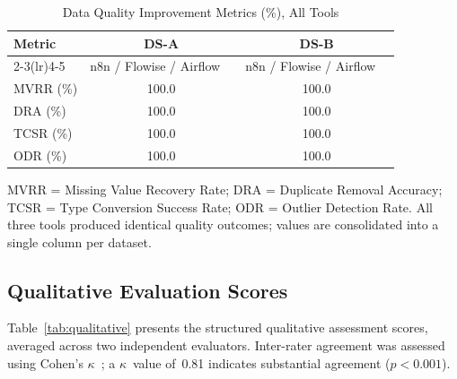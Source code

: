 \documentclass[journal]{IEEEtran}
\begin{document}
\begin{table}[!t]
  \caption{Data Quality Improvement Metrics (\%), All Tools}
  \label{tab:quality}
  \begin{threeparttable}
  \renewcommand{\arraystretch}{1.25}
  \centering
  \small
  \begin{tabular}{@{}lcccc@{}}
    \toprule
    \multirow{2}{*}{\textbf{Metric}}
      & \multicolumn{2}{c}{\textbf{DS-A}}
      & \multicolumn{2}{c}{\textbf{DS-B}} \\
    \cmidrule(lr){2-3}\cmidrule(lr){4-5}
      & n8n / Flowise / Airflow & & n8n / Flowise / Airflow & \\
    \midrule
    MVRR (\%) & \multicolumn{2}{c}{100.0} & \multicolumn{2}{c}{100.0} \\
    DRA  (\%) & \multicolumn{2}{c}{100.0} & \multicolumn{2}{c}{100.0} \\
    TCSR (\%) & \multicolumn{2}{c}{100.0} & \multicolumn{2}{c}{100.0} \\
    ODR  (\%) & \multicolumn{2}{c}{100.0} & \multicolumn{2}{c}{100.0} \\
    \bottomrule
  \end{tabular}
  \begin{tablenotes}
    \footnotesize
    \item MVRR = Missing Value Recovery Rate; DRA = Duplicate Removal
    Accuracy; TCSR = Type Conversion Success Rate; ODR = Outlier Detection
    Rate. All three tools produced identical quality outcomes; values are
    consolidated into a single column per dataset.
  \end{tablenotes}
  \end{threeparttable}
\end{table}

\subsection{Qualitative Evaluation Scores}

Table~\ref{tab:qualitative} presents the structured qualitative
assessment scores, averaged across two independent evaluators.
Inter-rater agreement was assessed using Cohen's
$\kappa$~\cite{cohen1960coefficient}; a $\kappa$~value of~0.81
indicates substantial agreement ($p < 0.001$).
\end{document}
